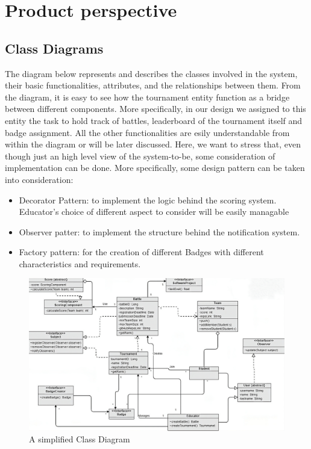 \section{Product perspective}
\label{sec:product_perspective}%

\subsection{Class Diagrams}
\label{subsec:class_diagrams}%
The diagram below represents and describes the classes involved in the system, their basic functionalities, attributes,
and the relationships between them.
From the diagram, it is easy to see how the tournament entity function as a bridge between different
components. More specifically, in our design we assigned to this entity the task to hold track 
of battles, leaderboard of the tournament itself and badge assignment.
All the other functionalities are esily understandable from within the diagram or 
will be later discussed. \newline
Here, we want to stress that, even though just an high level view of the system-to-be, some consideration of implementation can be done. 
More specifically, some design pattern can be taken into consideration:
\begin{itemize}
    \item Decorator Pattern: to implement the logic behind the scoring system. Educator's choice of different aspect to consider will be easily managable 
    \item Observer patter: to implement the structure behind the notification system.
    \item Factory pattern: for the creation of different Badges with different characteristics and requirements.
  \end{itemize}

\begin{figure}[H]
    \begin{center}
        \includegraphics[width=0.9\linewidth]{Images/class-diagram.jpeg}
        \caption{A simplified Class Diagram}
        \label{fig:class_diagram}%
    \end{center}
\end{figure}

